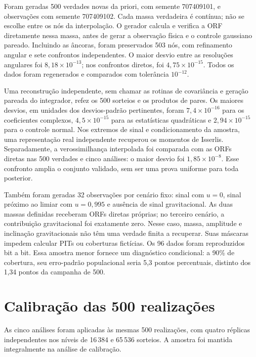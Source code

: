 Foram geradas 500 verdades novas da priori, com semente 707409101,
e observações com semente 707409102. Cada massa verdadeira é contínua;
não se escolhe entre os nós da interpolação. O gerador calcula e verifica
a ORF diretamente nessa massa, antes de gerar a observação física e o
controle gaussiano pareado. Incluindo as âncoras, foram preservados
503 nós, com refinamento angular e sete confrontos independentes.
O maior desvio entre as resoluções angulares foi
\(8{,}18\times10^{-13}\); nos confrontos diretos, foi
\(4{,}75\times10^{-15}\). Todos os dados foram regenerados e comparados
com tolerância \(10^{-12}\).

Uma reconstrução independente, sem chamar as rotinas de covariância
e geração pareada do integrador, refez os 500 sorteios e os produtos de
pares. Os maiores desvios, em unidades dos desvios-padrão pertinentes,
foram \(7{,}4\times10^{-16}\) para os coeficientes complexos,
\(4{,}5\times10^{-15}\) para as estatísticas quadráticas e
\(2{,}94\times10^{-15}\) para o controle normal. Nos extremos de sinal
e condicionamento da amostra, uma representação real independente
recuperou os momentos de Isserlis. Separadamente, a verossimilhança
interpolada foi comparada com as ORFs diretas nas 500 verdades e cinco
análises: o maior desvio foi \(1{,}85\times10^{-8}\). Esse confronto
amplia o conjunto validado, sem ser uma prova uniforme para toda posterior.

Também foram geradas 32 observações por cenário fixo: sinal com \(u=0\),
sinal próximo ao limiar com \(u=0{,}995\) e ausência de sinal
gravitacional. As duas massas definidas receberam ORFs diretas próprias;
no terceiro cenário, a contribuição gravitacional foi exatamente zero.
Nesse caso, massa, amplitude e inclinação gravitacionais não têm uma
verdade finita a recuperar. Suas máscaras impedem calcular PITs ou
coberturas fictícias. Os 96 dados foram reproduzidos bit a bit. Essa
amostra menor fornece um diagnóstico condicional: a 90\% de cobertura,
seu erro-padrão populacional seria 5,3 pontos percentuais, distinto dos
1,34 pontos da campanha de 500.

\section{Calibração das 500 realizações}
\label{sec:c07-resultados-sbc}

As cinco análises foram aplicadas às mesmas 500 realizações, com
quatro réplicas independentes nos níveis de 16\,384 e 65\,536 sorteios.
A amostra foi mantida integralmente na análise de calibração.


